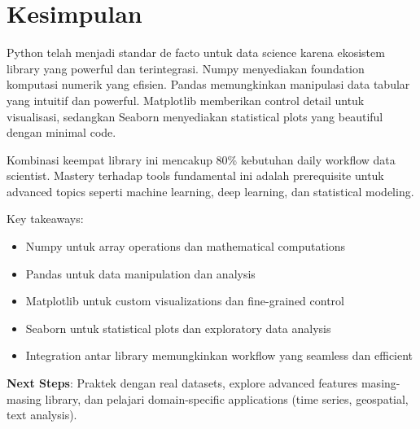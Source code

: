 \section*{Kesimpulan}

Python telah menjadi standar de facto untuk data science karena ekosistem library yang powerful dan terintegrasi. Numpy menyediakan foundation komputasi numerik yang efisien. Pandas memungkinkan manipulasi data tabular yang intuitif dan powerful. Matplotlib memberikan control detail untuk visualisasi, sedangkan Seaborn menyediakan statistical plots yang beautiful dengan minimal code.

Kombinasi keempat library ini mencakup 80\% kebutuhan daily workflow data scientist. Mastery terhadap tools fundamental ini adalah prerequisite untuk advanced topics seperti machine learning, deep learning, dan statistical modeling.

Key takeaways:
\begin{itemize}
  \item Numpy untuk array operations dan mathematical computations
  \item Pandas untuk data manipulation dan analysis
  \item Matplotlib untuk custom visualizations dan fine-grained control
  \item Seaborn untuk statistical plots dan exploratory data analysis
  \item Integration antar library memungkinkan workflow yang seamless dan efficient
\end{itemize}

\textbf{Next Steps}: Praktek dengan real datasets, explore advanced features masing-masing library, dan pelajari domain-specific applications (time series, geospatial, text analysis).
